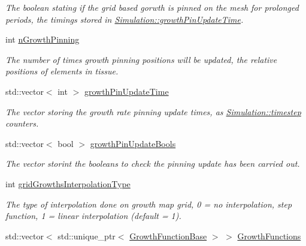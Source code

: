 \begin{DoxyCompactItemize}
\begin{DoxyCompactList}\small\item\em The boolean stating if the grid based gorwth is pinned on the mesh for prolonged periods, the timings stored in \hyperlink{classSimulation_ad6454fcc9e796f92d6c9aec482f10191}{Simulation\+::growth\+Pin\+Update\+Time}. \end{DoxyCompactList}\item 
\hypertarget{classSimulation_a505b17bf704f4ee58df2490b993c8f15}{}int \hyperlink{classSimulation_a505b17bf704f4ee58df2490b993c8f15}{n\+Growth\+Pinning}\label{classSimulation_a505b17bf704f4ee58df2490b993c8f15}

\begin{DoxyCompactList}\small\item\em The number of times growth pinning positions will be updated, the relative positions of elements in tissue. \end{DoxyCompactList}\item 
\hypertarget{classSimulation_ad6454fcc9e796f92d6c9aec482f10191}{}std\+::vector$<$ int $>$ \hyperlink{classSimulation_ad6454fcc9e796f92d6c9aec482f10191}{growth\+Pin\+Update\+Time}\label{classSimulation_ad6454fcc9e796f92d6c9aec482f10191}

\begin{DoxyCompactList}\small\item\em The vector storing the growth rate pinning update times, as \hyperlink{classSimulation_a2056af9924aff237c804ffe006adc00b}{Simulation\+::timestep} counters. \end{DoxyCompactList}\item 
\hypertarget{classSimulation_a7209f8394d5888670e14e3d46c89718f}{}std\+::vector$<$ bool $>$ \hyperlink{classSimulation_a7209f8394d5888670e14e3d46c89718f}{growth\+Pin\+Update\+Bools}\label{classSimulation_a7209f8394d5888670e14e3d46c89718f}

\begin{DoxyCompactList}\small\item\em The vector storint the booleans to check the pinning update has been carried out. \end{DoxyCompactList}\item 
\hypertarget{classSimulation_a6a4bbc66c4a2bb43de57509d25ce6ac4}{}int \hyperlink{classSimulation_a6a4bbc66c4a2bb43de57509d25ce6ac4}{grid\+Growths\+Interpolation\+Type}\label{classSimulation_a6a4bbc66c4a2bb43de57509d25ce6ac4}

\begin{DoxyCompactList}\small\item\em The type of interpolation done on growth map grid, 0 = no interpolation, step function, 1 = linear interpolation (default = 1). \end{DoxyCompactList}\item 
\hypertarget{classSimulation_a425b8ee683e10f79d04e8710d82dafe2}{}std\+::vector$<$ std\+::unique\+\_\+ptr$<$ \hyperlink{classGrowthFunctionBase}{Growth\+Function\+Base} $>$ $>$ \hyperlink{classSimulation_a425b8ee683e10f79d04e8710d82dafe2}{Growth\+Functions}\label{classSimulation_a425b8ee683e10f79d04e8710d82dafe2}


\end{DoxyCompactItemize}
